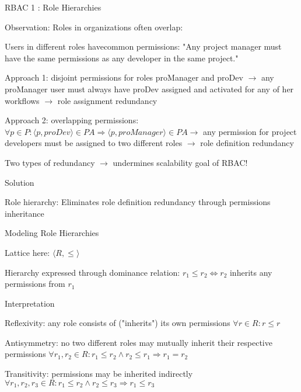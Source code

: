 \documentclass[a4paper]{article}
\begin{document}
\begin{multicols}{3}
    RBAC 1 : Role Hierarchies
    \begin{itemize*}
        \item Observation: Roles in organizations often overlap:
              \begin{itemize*}
                  \item Users in different roles havecommon permissions: "Any project manager must have the same permissions as any developer in the same project."
                  \item Approach 1: disjoint permissions for roles proManager and proDev $\rightarrow$ any proManager user must always have proDev assigned and activated for any of her workflows $\rightarrow$ role assignment redundancy
                  \item Approach 2: overlapping permissions: $\forall p\in P:⟨p,proDev⟩ \in PA\Rightarrow ⟨p,proManager⟩ \in PA\rightarrow$ any permission for project developers must be assigned to two different roles $\rightarrow$ role definition redundancy
                  \item Two types of redundancy $\rightarrow$ undermines scalability goal of RBAC!
              \end{itemize*}
        \item Solution
              \begin{itemize*}
                  \item Role hierarchy: Eliminates role definition redundancy through permissions inheritance
              \end{itemize*}
        \item Modeling Role Hierarchies
              \begin{itemize*}
                  \item Lattice here: $⟨R,\leq⟩$
                  \item Hierarchy expressed through dominance relation: $r_1\leq r_2 \Leftrightarrow r_2$ inherits any permissions from $r_1$
                  \item Interpretation
                        \begin{itemize*}
                            \item Reflexivity: any role consists of ("inherits") its own permissions $\forall r\in R:r\leq r$
                            \item Antisymmetry: no two different roles may mutually inherit their respective permissions $\forall r_1 ,r_2\in R:r_1\leq r_2\wedge r_2\leq r_1\Rightarrow r_1=r_2$
                            \item Transitivity: permissions may be inherited indirectly $\forall r_1,r_2,r_3\in R:r_1\leq r_2 \wedge r_2\leq r_3\Rightarrow r_1\leq r_3$
                        \end{itemize*}
              \end{itemize*}
    \end{itemize*}


\end{multicols}
\end{document}
